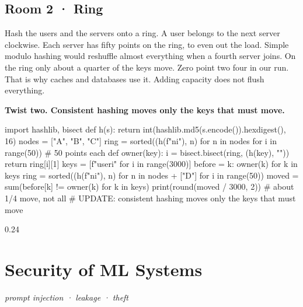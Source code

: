 \documentclass[11pt,a4paper]{report}
\begin{document}
\section*{Room 2 · Ring}
Hash the users and the servers onto a ring. A user belongs to the next server clockwise. Each server has fifty points on the ring, to even out the load. Simple modulo hashing would reshuffle almost everything when a fourth server joins. On the ring only about a quarter of the keys move. Zero point two four in our run. That is why caches and databases use it. Adding capacity does not flush everything.
\begin{tcolorbox}[colback=yellow!12,colframe=orange!70!black,boxrule=0.4pt,left=4pt,right=4pt,top=2pt,bottom=2pt]\textbf{Twist two. Consistent hashing moves only the keys that must move.}\end{tcolorbox}
\begin{Code}
import hashlib, bisect
def h(s): return int(hashlib.md5(s.encode()).hexdigest(), 16) %
nodes = ["A", "B", "C"]
ring = sorted((h(f"{n}{i}"), n) for n in nodes for i in range(50))   # 50 points each
def owner(key):
    i = bisect.bisect(ring, (h(key), "")) %
    return ring[i][1]
keys = [f"user{i}" for i in range(3000)]
before = {k: owner(k) for k in keys}
ring = sorted((h(f"{n}{i}"), n) for n in nodes + ["D"] for i in range(50))
moved = sum(before[k] != owner(k) for k in keys)
print(round(moved / 3000, 2))               # about 1/4 move, not all
# UPDATE: consistent hashing moves only the keys that must move
\end{Code}
\begin{Out}
0.24
\end{Out}
\chapter{Security of ML Systems}
\textit{prompt injection · leakage · theft}
\end{document}

